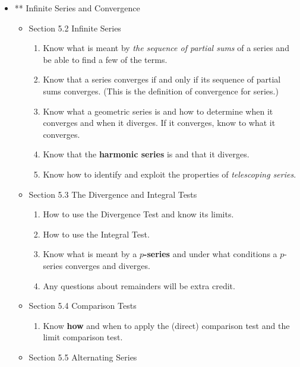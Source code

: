 \documentclass[11pt,fleqn]{article}
\begin{document}
\begin{itemize}
\item ** Infinite Series and Convergence
	\begin{itemize}
	\item Section 5.2 Infinite Series\\
		\begin{enumerate}
		\item Know what is meant by \emph{the sequence of partial sums} of a series and be able to find a few of the terms.
		\item Know that a series converges if and only if its sequence of partial sums converges. (This is the definition of convergence for series.)
		\item Know what a geometric series is and how to determine when it converges and when it diverges. If it converges, know to what it converges. 
		\item Know that the \textbf{harmonic series} is and that it diverges.
		\item Know how to identify and exploit the properties of \emph{telescoping series}.\\
		\end{enumerate}

	\item Section 5.3 The Divergence and Integral Tests\\

		\begin{enumerate}
		\item How to use the Divergence Test and know its limits.
		\item How to use the Integral Test.
		\item Know what is meant by a \textbf{$p$-series} and under what conditions a $p$-series converges and diverges.
		\item Any questions about remainders will be extra credit.\\
		\end{enumerate}

	\item Section 5.4 Comparison Tests\\

		\begin{enumerate}
		\item Know \textbf{how} and when to apply the (direct) comparison test and the limit comparison test.\\
		\end{enumerate}

	\item Section 5.5 Alternating Series \\


\end{itemize}
\end{itemize}
\end{document}

